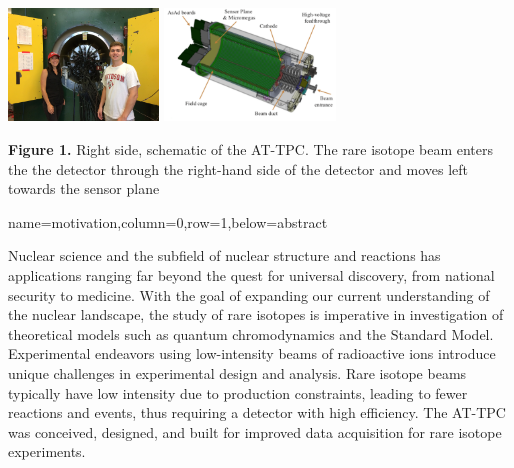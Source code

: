 \documentclass[a0paper,portrait]{baposter}
\begin{document}
\begin{poster}
{\begin{center}
\includegraphics [height=30mm]{michigan_trip.jpg} %
\hspace{0.2cm}
\includegraphics [height=30mm] {attpc.png}
\end{center}

\small{\textbf{Figure 1.}
Right side, schematic of the AT-TPC. The rare isotope beam enters the the detector through the right-hand side of the detector and moves left towards the sensor plane}

}
{name=motivation,column=0,row=1,below=abstract}
{\small{Nuclear science and the subfield of nuclear structure and reactions has applications ranging far beyond the quest for universal discovery, from national security to medicine. With the goal of expanding our current understanding of the nuclear landscape, the study of rare isotopes is imperative in investigation of theoretical models such as quantum chromodynamics and the Standard Model. Experimental endeavors using low-intensity beams of radioactive ions introduce unique challenges in experimental design and analysis. Rare isotope beams typically have low intensity due to production constraints, leading to fewer reactions and events, thus requiring a detector with high efficiency. The AT-TPC was conceived, designed, and built for improved data acquisition for rare isotope experiments. 

}}
\end{poster}
\end{document}
